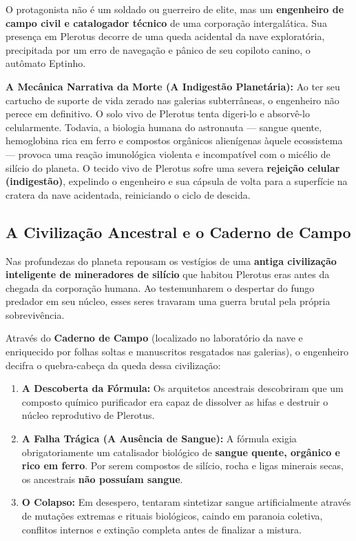 \documentclass[a4paper,12pt]{report}
\begin{document}
O protagonista não é um soldado ou guerreiro de elite, mas um \textbf{engenheiro de campo civil e catalogador técnico} de uma corporação intergalática. Sua presença em Plerotus decorre de uma queda acidental da nave exploratória, precipitada por um erro de navegação e pânico de seu copiloto canino, o autômato Eptinho.

\textbf{A Mecânica Narrativa da Morte (A Indigestão Planetária):} Ao ter seu cartucho de suporte de vida zerado nas galerias subterrâneas, o engenheiro não perece em definitivo. O solo vivo de Plerotus tenta digeri-lo e absorvê-lo celularmente. Todavia, a biologia humana do astronauta --- sangue quente, hemoglobina rica em ferro e compostos orgânicos alienígenas àquele ecossistema --- provoca uma reação imunológica violenta e incompatível com o micélio de silício do planeta. O tecido vivo de Plerotus sofre uma severa \textbf{rejeição celular (indigestão)}, expelindo o engenheiro e sua cápsula de volta para a superfície na cratera da nave acidentada, reiniciando o ciclo de descida.

\subsection{A Civilização Ancestral e o Caderno de Campo}
Nas profundezas do planeta repousam os vestígios de uma \textbf{antiga civilização inteligente de mineradores de silício} que habitou Plerotus eras antes da chegada da corporação humana. Ao testemunharem o despertar do fungo predador em seu núcleo, esses seres travaram uma guerra brutal pela própria sobrevivência.

Através do \textbf{Caderno de Campo} (localizado no laboratório da nave e enriquecido por folhas soltas e manuscritos resgatados nas galerias), o engenheiro decifra o quebra-cabeça da queda dessa civilização:
\begin{enumerate}
    \item \textbf{A Descoberta da Fórmula:} Os arquitetos ancestrais descobriram que um composto químico purificador era capaz de dissolver as hifas e destruir o núcleo reprodutivo de Plerotus.
    \item \textbf{A Falha Trágica (A Ausência de Sangue):} A fórmula exigia obrigatoriamente um catalisador biológico de \textbf{sangue quente, orgânico e rico em ferro}. Por serem compostos de silício, rocha e ligas minerais secas, os ancestrais \textbf{não possuíam sangue}.
    \item \textbf{O Colapso:} Em desespero, tentaram sintetizar sangue artificialmente através de mutações extremas e rituais biológicos, caindo em paranoia coletiva, conflitos internos e extinção completa antes de finalizar a mistura.
\end{enumerate}
\end{document}

